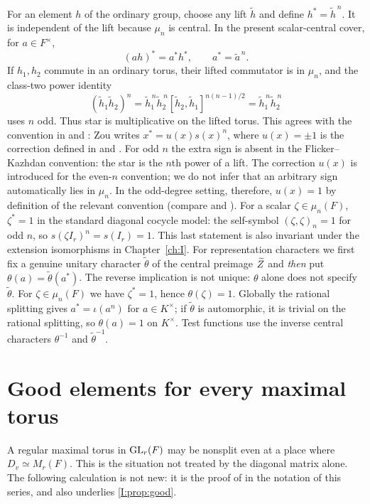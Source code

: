For an element $h$ of the ordinary group, choose any lift
$\widetilde h$ and define $h^*=\widetilde h^{\,n}$.  It is
independent of the lift because $\mu_n$ is central.  In the present
scalar-central cover, for $a\in F^\times$,
\begin{equation}\label{IV:eq:starcentral}
 (ah)^*=a^*h^*,\qquad a^*=\widetilde a^{\,n}.
\end{equation}
If $h_1,h_2$ commute in an ordinary torus, their lifted commutator
is in $\mu_n$, and the class-two power identity
\begin{equation}\label{IV:eq:starpower}
 (\widetilde h_1\widetilde h_2)^n
 =\widetilde h_1^{\,n}\widetilde h_2^{\,n}
 [\widetilde h_2,\widetilde h_1]^{n(n-1)/2}
 =\widetilde h_1^{\,n}\widetilde h_2^{\,n}
\end{equation}
uses $n$ odd.  Thus star is multiplicative on the lifted torus.
This agrees with the convention in \cite[\S4]{FK86} and \cite[\S3]{Zo23}:
Zou writes $x^*=u(x)s(x)^n$, where $u(x)=\pm1$ is the
correction defined in \cite[\S4]{FK86} and \cite[\S3.1]{Zo23}.
For odd $n$ the extra sign is absent in the
Flicker--Kazhdan convention: the star is the $n$th power of a lift.
The correction $u(x)$ is introduced for the even-$n$ convention;
we do not infer that an arbitrary sign automatically lies in
$\mu_n$.  In the odd-degree setting, therefore, $u(x)=1$
by definition of the relevant convention (compare
\cite[\S4]{FK86} and \cite[\S3.1]{Zo23}).  For a scalar $\zeta\in\mu_n(F)$,
$\zeta^*=1$ in the standard diagonal cocycle model: the
self-symbol $(\zeta,\zeta)_n=1$ for odd $n$, so
$s(\zeta I_r)^n=s(I_r)=1$.  This last statement is also
invariant under the extension isomorphisms in Chapter~\ref{ch:I}.
For representation characters we first fix a genuine unitary
character $\widetilde\theta$ of the central preimage $\widetilde Z$ and
\emph{then} put $\theta(a)=\widetilde\theta(a^*)$.
The reverse implication is not unique: $\theta$ alone does not
specify $\widetilde\theta$.  For $\zeta\in\mu_n(F)$ we have
$\zeta^*=1$, hence $\theta(\zeta)=1$.  Globally the rational
splitting gives $a^*=\iota(a^n)$ for $a\in K^\times$;
if $\widetilde\theta$ is automorphic, it is trivial on the rational
splitting, so $\theta(a)=1$ on $K^\times$.
Test functions use the inverse central characters
$\theta^{-1}$ and $\widetilde\theta^{-1}$.

\section{Good elements for every maximal torus}\label{IV:sec:good}
A regular maximal torus in $\operatorname{GL}_r(F)$ may be nonsplit even at a
place where $D_v\simeq M_r(F)$.  This is the situation not treated by
the diagonal matrix alone.  The following calculation is not new:
it is the proof of \cite[\S3, Proposition]{FK86} in the notation of this
series, and also underlies \cref{I:prop:good}.


